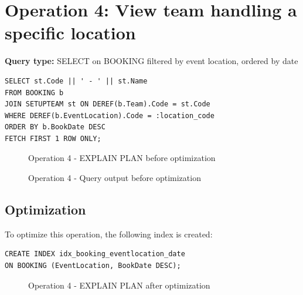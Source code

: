 \section{Operation 4: View team handling a specific location}

\textbf{Query type:} SELECT on BOOKING filtered by event location, ordered by date

\begin{lstlisting}
SELECT st.Code || ' - ' || st.Name
FROM BOOKING b
JOIN SETUPTEAM st ON DEREF(b.Team).Code = st.Code
WHERE DEREF(b.EventLocation).Code = :location_code
ORDER BY b.BookDate DESC
FETCH FIRST 1 ROW ONLY;
\end{lstlisting}

\begin{figure}[H]
    \centering
    \caption{Operation 4 - EXPLAIN PLAN before optimization}
\end{figure}

\begin{figure}[H]
    \centering
    \begin{subfigure}[t]{0.49\textwidth}
        \centering
    \end{subfigure}
    \hfill
    \begin{subfigure}[t]{0.49\textwidth}
        \centering
    \end{subfigure}
    \caption{Operation 4 - Query output before optimization}
\end{figure}

\subsection{Optimization}

To optimize this operation, the following index is created:

\begin{lstlisting}
CREATE INDEX idx_booking_eventlocation_date
ON BOOKING (EventLocation, BookDate DESC);
\end{lstlisting}

\begin{figure}[H]
    \centering
    \caption{Operation 4 - EXPLAIN PLAN after optimization}
\end{figure}


